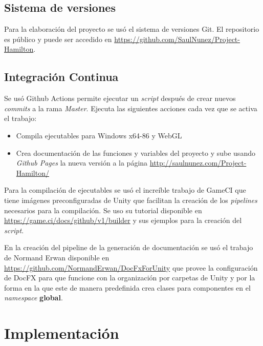 \subsection{Sistema de versiones}
Para la elaboración del proyecto se usó el sistema de versiones Git. El repositorio es público y puede ser accedido en \url{https://github.com/SaulNunez/Project-Hamilton}.

\subsection{Integración Continua}
Se usó Github Actions permite ejecutar un \textit{script} después de crear nuevos \textit{commits} a la rama \textit{Master}.
Ejecuta las siguientes acciones cada vez que se activa el trabajo:
\begin{itemize}
    \item Compila ejecutables para Windows x64-86 y WebGL
    \item Crea documentación de las funciones y variables del proyecto y sube usando \textit{Github Pages} la nueva versión a la página \url{http://saulnunez.com/Project-Hamilton/}
\end{itemize}

Para la compilación de ejecutables se usó el increíble trabajo de GameCI que tiene imágenes preconfiguradas de Unity que facilitan la creación de los \textit{pipelines} necesarios para la compilación. Se uso su tutorial disponible en \url{https://game.ci/docs/github/v1/builder} y sus ejemplos para la creación del \textit{script}.

En la creación del pipeline de la generación de documentación se usó el trabajo de Normand Erwan disponible en \url{https://github.com/NormandErwan/DocFxForUnity} que provee la configuración de DocFX para que funcione con la organización por carpetas de Unity y por la forma en la que este de manera predefinida crea clases para componentes en el \textit{namespace} \textbf{global}.

\section{Implementación}
